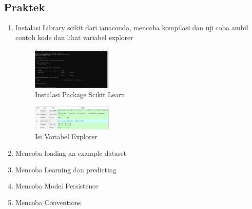 \subsection{Praktek}
\begin{enumerate}
	\item Instalasi Library scikit dari ianaconda, mencoba kompilasi dan uji coba ambil contoh kode dan lihat variabel explorer
	\hfill\break
	\begin{figure}[H]
		\includegraphics[width=4cm]{figures/1174003/1/1.PNG}
		\centering
		\caption{Instalasi Package Scikit Learn}
	\end{figure}
	\begin{figure}[H]
		\includegraphics[width=4cm]{figures/1174003/1/2.PNG}
		\centering
		\caption{Isi Variabel Explorer}
	\end{figure}
	\item Mencoba loading an example dataset
	\hfill\break
	
	\item Mencoba Learning dan predicting
	\hfill\break
	
	\item Mencoba Model Persistence
	\hfill\break
	
	\item Mencoba Conventions
	\hfill\break
	
\end{enumerate}

